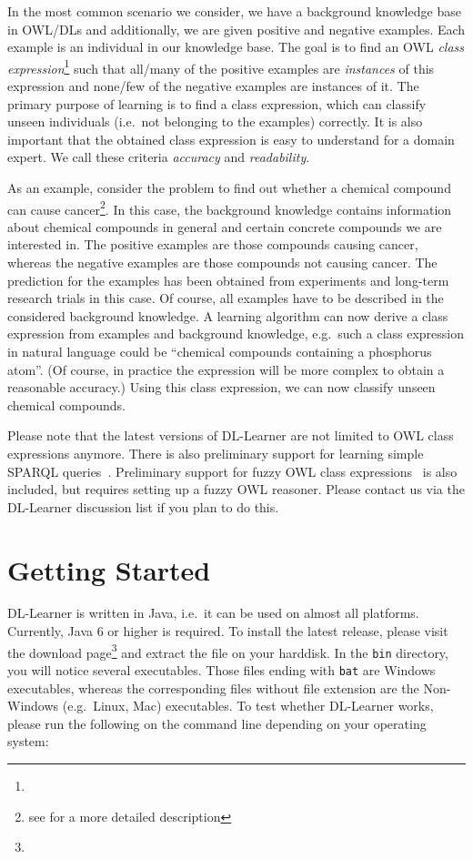 \documentclass[a4paper,12pt]{scrartcl}
\begin{document}
In the most common scenario we consider, we have a background knowledge base in OWL/DLs and additionally, we are given positive and negative examples. Each example is an individual in our knowledge base. The goal is to find an OWL \emph{class expression}\footnote{\owlce} such that all/many of the positive examples are \emph{instances} of this expression and none/few of the negative examples are instances of it. The primary purpose of learning is to find a class expression, which can classify unseen individuals (i.e.~not belonging to the examples) correctly. It is also important that the obtained class expression is easy to understand for a domain expert. We call these criteria \emph{accuracy} and \emph{readability}.

As an example, consider the problem to find out whether a chemical compound can cause cancer\footnote{see \carc{} for a more detailed description}. In this case, the background knowledge contains information about chemical compounds in general and certain concrete compounds we are interested in. The positive examples are those compounds causing cancer, whereas the negative examples are those compounds not causing cancer. The prediction for the examples has been obtained from experiments and long-term research trials in this case. Of course, all examples have to be described in the considered background knowledge. A learning algorithm can now derive a class expression from examples and background knowledge, e.g.~such a class expression in natural language could be ``chemical compounds containing a phosphorus atom''. (Of course, in practice the expression will be more complex to obtain a reasonable accuracy.) Using this class expression, we can now classify unseen chemical compounds.

Please note that the latest versions of DL-Learner are not limited to OWL class expressions anymore. There is also preliminary support for learning simple SPARQL queries~\cite{autosparql}. Preliminary support for fuzzy OWL class expressions~\cite{fuzzy} is also included, but requires setting up a fuzzy OWL reasoner. Please contact us via the DL-Learner discussion list if you plan to do this.

\section{Getting Started}
\label{sec:start}

DL-Learner is written in Java, i.e.~it can be used on almost all platforms. Currently, Java 6 or higher is required. To install the latest release, please visit the download page\footnote{\dldownload} and extract the file on your harddisk. In the \verb|bin| directory, you will notice several executables. Those files ending with \verb|bat| are Windows executables, whereas the corresponding files without file extension are the Non-Windows (e.g.~Linux, Mac) executables. To test whether DL-Learner works, please run the following on the command line depending on your operating system:
\end{document}
